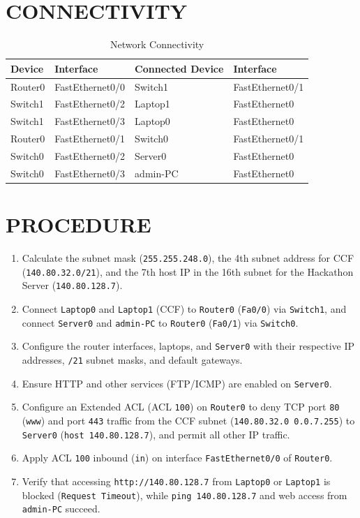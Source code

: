 \documentclass[12pt,a4paper]{article}
\begin{document}
	\section*{CONNECTIVITY}
	\begin{table}[H]
		\centering
		\begin{tabular}{|l|l|l|l|}
			\hline
			\textbf{Device} & \textbf{Interface} & \textbf{Connected Device} & \textbf{Interface} \\ \hline
			Router0  & FastEthernet0/0 & Switch1 & FastEthernet0/1 \\ \hline
			Switch1  & FastEthernet0/2 & Laptop1 & FastEthernet0   \\ \hline
			Switch1  & FastEthernet0/3 & Laptop0 & FastEthernet0   \\ \hline
			Router0  & FastEthernet0/1 & Switch0 & FastEthernet0/1 \\ \hline
			Switch0  & FastEthernet0/2 & Server0 & FastEthernet0   \\ \hline
			Switch0  & FastEthernet0/3 & admin-PC & FastEthernet0  \\ \hline
		\end{tabular}
		\caption{Network Connectivity}
	\end{table}
	
	\section*{PROCEDURE}
	\begin{enumerate}
		\item Calculate the subnet mask (\texttt{255.255.248.0}), the 4th subnet address for CCF (\texttt{140.80.32.0/21}), and the 7th host IP in the 16th subnet for the Hackathon Server (\texttt{140.80.128.7}).
		\item Connect \texttt{Laptop0} and \texttt{Laptop1} (CCF) to \texttt{Router0} (\texttt{Fa0/0}) via \texttt{Switch1}, and connect \texttt{Server0} and \texttt{admin-PC} to \texttt{Router0} (\texttt{Fa0/1}) via \texttt{Switch0}.
		\item Configure the router interfaces, laptops, and \texttt{Server0} with their respective IP addresses, \texttt{/21} subnet masks, and default gateways.
		\item Ensure HTTP and other services (FTP/ICMP) are enabled on \texttt{Server0}.
		\item Configure an Extended ACL (ACL \texttt{100}) on \texttt{Router0} to deny TCP port \texttt{80} (\texttt{www}) and port \texttt{443} traffic from the CCF subnet (\texttt{140.80.32.0 0.0.7.255}) to \texttt{Server0} (\texttt{host 140.80.128.7}), and permit all other IP traffic.
		\item Apply ACL \texttt{100} inbound (\texttt{in}) on interface \texttt{FastEthernet0/0} of \texttt{Router0}.
		\item Verify that accessing \texttt{http://140.80.128.7} from \texttt{Laptop0} or \texttt{Laptop1} is blocked (\texttt{Request Timeout}), while \texttt{ping 140.80.128.7} and web access from \texttt{admin-PC} succeed.
	\end{enumerate}
	
\end{document}
